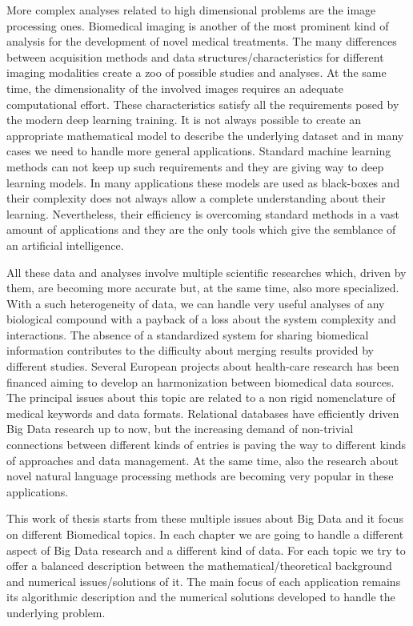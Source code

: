 \documentclass{standalone}
\begin{document}
More complex analyses related to high dimensional problems are the image processing ones.
Biomedical imaging is another of the most prominent kind of analysis for the development of novel medical treatments.
The many differences between acquisition methods and data structures/characteristics for different imaging modalities create a zoo of possible studies and analyses.
At the same time, the dimensionality of the involved images requires an adequate computational effort.
These characteristics satisfy all the requirements posed by the modern deep learning training.
It is not always possible to create an appropriate mathematical model to describe the underlying dataset and in many cases we need to handle more general applications.
Standard machine learning methods can not keep up such requirements and they are giving way to deep learning models.
In many applications these models are used as black-boxes and their complexity does not always allow a complete understanding about their learning.
Nevertheless, their efficiency is overcoming standard methods in a vast amount of applications and they are the only tools which give the semblance of an artificial intelligence.

All these data and analyses involve multiple scientific researches which, driven by them, are becoming more accurate but, at the same time, also more specialized.
With a such heterogeneity of data, we can handle very useful analyses of any biological compound with a payback of a loss about the system complexity and interactions.
The absence of a standardized system for sharing biomedical information contributes to the difficulty about merging results provided by different studies.
Several European projects about health-care research has been financed aiming to develop an harmonization between biomedical data sources.
The principal issues about this topic are related to a non rigid nomenclature of medical keywords and data formats.
Relational databases have efficiently driven Big Data research up to now, but the increasing demand of non-trivial connections between different kinds of entries is paving the way to different kinds of approaches and data management.
At the same time, also the research about novel natural language processing methods are becoming very popular in these applications.

This work of thesis starts from these multiple issues about Big Data and it focus on different Biomedical topics.
In each chapter we are going to handle a different aspect of Big Data research and a different kind of data.
For each topic we try to offer a balanced description between the mathematical/theoretical background and numerical issues/solutions of it.
The main focus of each application remains its algorithmic description and the numerical solutions developed to handle the underlying problem.
\end{document}
